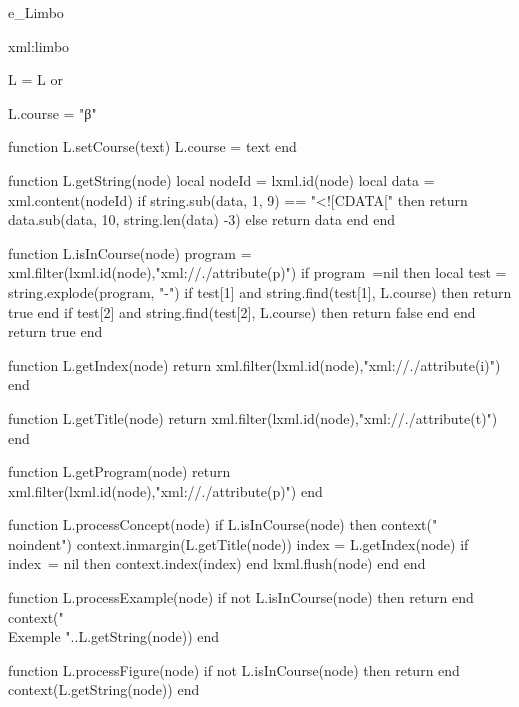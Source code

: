 \startenvironment e_Limbo
\unprotect




%
%
%
%

\startxmlsetups xml:limbo
\stopxmlsetups 


\startluacode 
    L = L or {}
  
 L.course = "β"

 function L.setCourse(text)
   L.course = text
 end
 
 function L.getString(node)
  local nodeId = lxml.id(node)
  local data = xml.content(nodeId)
  if string.sub(data, 1, 9) == "<![CDATA[" then 
  	return data.sub(data, 10, string.len(data) -3) 
  else 
  	return data 
  end
end
 
 
function L.isInCourse(node)
  program = xml.filter(lxml.id(node),"xml://./attribute(p)")
  if program~=nil then 
    local test = string.explode(program, "-")
    if test[1] and string.find(test[1], L.course) then return true end
    if test[2] and string.find(test[2], L.course) then return false end
  end
  return true
end

function L.getIndex(node)
  return xml.filter(lxml.id(node),"xml://./attribute(i)")
end

function L.getTitle(node)
  return xml.filter(lxml.id(node),"xml://./attribute(t)")
end

function L.getProgram(node)
  return xml.filter(lxml.id(node),"xml://./attribute(p)")
end


function L.processConcept(node)
  if L.isInCourse(node) then 
    context("\\noindent")
    context.inmargin(L.getTitle(node))
    index = L.getIndex(node)
    if index~= nil then context.index(index) end
    lxml.flush(node)
  end
end

function L.processExample(node)
  if not L.isInCourse(node) then return end
  context("\\Exemple "..L.getString(node))
end

function L.processFigure(node)
  if not L.isInCourse(node) then return end
  context(L.getString(node))
end

